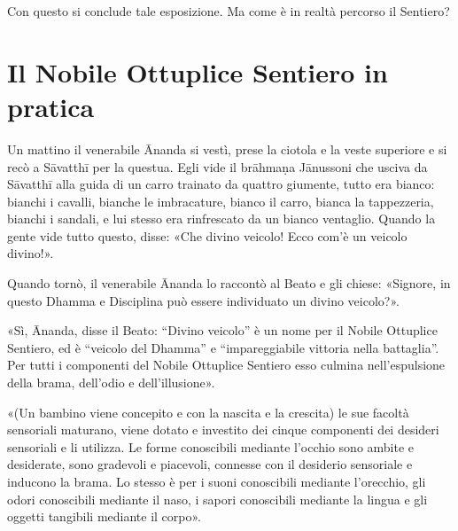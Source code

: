 

 Con questo si conclude tale esposizione. Ma come è in
realtà percorso il Sentiero?


\hypertarget{x-il-nobile-ottuplice-sentiero-in-pratica}{\section*{Il Nobile Ottuplice Sentiero in pratica}}
 \label{pag281}Un mattino il venerabile Ānanda si vestì, prese la ciotola e
la veste superiore e si recò a Sāvatthī per la questua. Egli vide il
brāhmaṇa Jānussoni che usciva da Sāvatthī alla guida di un carro
trainato da quattro giumente, tutto era bianco: bianchi i cavalli,
bianche le imbracature, bianco il carro, bianca la tappezzeria, bianchi
i sandali, e lui stesso era rinfrescato da un bianco ventaglio. Quando
la gente vide tutto questo, disse: «Che divino veicolo! Ecco com’è un
veicolo divino!».


Quando tornò, il venerabile Ānanda lo raccontò al Beato e gli chiese:
«Signore, in questo Dhamma e Disciplina può essere individuato un divino
veicolo?».


«Sì, Ānanda, disse il Beato: “Divino veicolo” è un nome per il Nobile
Ottuplice Sentiero, ed è “veicolo del Dhamma” e “impareggiabile vittoria
nella battaglia”. Per tutti i componenti del Nobile Ottuplice Sentiero
esso culmina nell’espulsione della brama, dell’odio e dell’illusione».




«(Un bambino viene concepito e con la nascita e la crescita) le sue
facoltà sensoriali maturano, viene dotato e investito dei cinque
componenti dei desideri sensoriali e li utilizza. Le forme conoscibili
mediante l’occhio sono ambite e desiderate, sono gradevoli e piacevoli,
connesse con il desiderio sensoriale e inducono la brama. Lo stesso è
per i suoni conoscibili mediante l’orecchio, gli odori conoscibili
mediante il naso, i sapori conoscibili mediante la lingua e gli oggetti
tangibili mediante il corpo».


